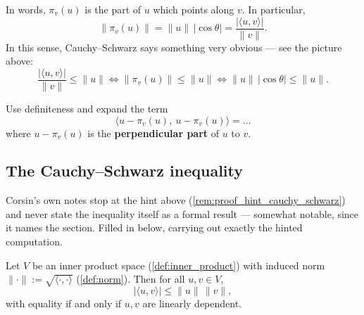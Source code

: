 \begin{center}
\end{center}

In words, $\pi_v(u)$ is the part of $u$ which points along $v$. In particular,
\[
\|\pi_v(u)\| = \|u\|\,|\cos\theta| = \frac{|\langle u,v\rangle|}{\|v\|}.
\]
In this sense, Cauchy--Schwarz says something very obvious --- see the picture above:
\[
\frac{|\langle u,v\rangle|}{\|v\|} \leq \|u\| \iff \|\pi_v(u)\| \leq \|u\| \iff \|u\|\,|\cos\theta| \leq \|u\|.
\]

\begin{remark}
\label{rem:proof_hint_cauchy_schwarz}
Use definiteness and expand the term
\[
\langle u - \pi_v(u),\ u - \pi_v(u)\rangle = \dots
\]
where $u - \pi_v(u)$ is the \textbf{perpendicular part} of $u$ to $v$.
\end{remark}

\subsection{The Cauchy--Schwarz inequality}

\begin{ainote}
Corsin's own notes stop at the hint above (\cref{rem:proof_hint_cauchy_schwarz}) and never state
the inequality itself as a formal result --- somewhat notable, since it names the section. Filled
in below, carrying out exactly the hinted computation.
\end{ainote}

\begin{theorem}
\label{thm:cauchy_schwarz}
Let $V$ be an inner product space (\cref{def:inner_product}) with induced norm
$\|\cdot\| := \sqrt{\langle\cdot,\cdot\rangle}$ (\cref{def:norm}). Then for all $u,v \in V$,
\[|\langle u,v\rangle| \leq \|u\|\,\|v\|,\]
with equality if and only if $u,v$ are linearly dependent.
\end{theorem}

